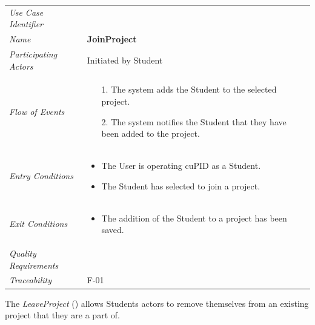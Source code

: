 \documentclass[12pt,letterpaper]{article}
\begin{document}
\begin{center}
	\begin{tabu} to 
		\toprule
		Use Case Identifier & \joinproject{} \\
		Name & {\bf JoinProject} \\
		Participating Actors & Initiated by Student \\
		Flow of Events & 
		\begin{minipage}[t]{\linewidth}
		    \begin{enumerate}
				\item[1.] The system adds the Student to the selected project.
				\item[2.] The system notifies the Student that they have been added to the project.
			\end{enumerate}
		\end{minipage} \\

		Entry Conditions &
		\begin{minipage}[t]{\linewidth}
			\begin{itemize}
			    \item The User is operating cuPID as a Student.
			    \item The Student has selected to join a project.
	        \end{itemize}
		\end{minipage} \\

		Exit Conditions &
		\begin{minipage}[t]{\linewidth}
			\begin{itemize}
			    \item The addition of the Student to a project has been saved.
	        \end{itemize}
		\end{minipage} \\

		Quality Requirements & \\

		Traceability & F-01 \\
		\toprule
	\end{tabu}
\end{center}

\vspace{1em}
The {\it LeaveProject} ({\bf \leaveproject{}}) allows Students actors to remove themselves from an existing project that they are a part of.
\end{document}
